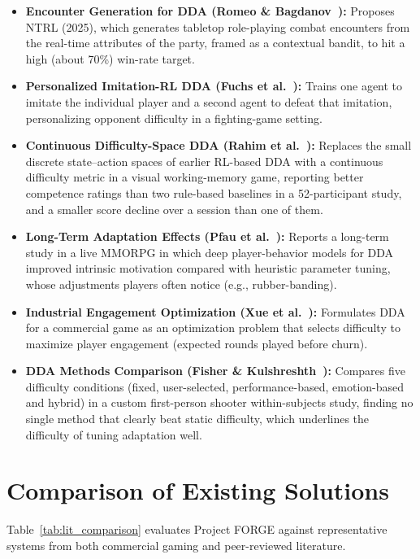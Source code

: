 \begin{itemize}
    \item \textbf{Encounter Generation for DDA (Romeo \& Bagdanov~\cite{romeo2025ntrl}):} Proposes NTRL (2025), which generates tabletop role-playing combat encounters from the real-time attributes of the party, framed as a contextual bandit, to hit a high (about 70\%) win-rate target.
    \item \textbf{Personalized Imitation-RL DDA (Fuchs et al.~\cite{fuchs2024personalized}):} Trains one agent to imitate the individual player and a second agent to defeat that imitation, personalizing opponent difficulty in a fighting-game setting.
    \item \textbf{Continuous Difficulty-Space DDA (Rahim et al.~\cite{rahim2023continuous}):} Replaces the small discrete state--action spaces of earlier RL-based DDA with a continuous difficulty metric in a visual working-memory game, reporting better competence ratings than two rule-based baselines in a 52-participant study, and a smaller score decline over a session than one of them.
    \item \textbf{Long-Term Adaptation Effects (Pfau et al.~\cite{pfau2020enemy}):} Reports a long-term study in a live MMORPG in which deep player-behavior models for DDA improved intrinsic motivation compared with heuristic parameter tuning, whose adjustments players often notice (e.g., rubber-banding).
    \item \textbf{Industrial Engagement Optimization (Xue et al.~\cite{xue2017dynamic}):} Formulates DDA for a commercial game as an optimization problem that selects difficulty to maximize player engagement (expected rounds played before churn).
    \item \textbf{DDA Methods Comparison (Fisher \& Kulshreshth~\cite{fisher2024exploring}):} Compares five difficulty conditions (fixed, user-selected, performance-based, emotion-based and hybrid) in a custom first-person shooter within-subjects study, finding no single method that clearly beat static difficulty, which underlines the difficulty of tuning adaptation well.
\end{itemize}

\section{Comparison of Existing Solutions}
Table~\ref{tab:lit_comparison} evaluates Project FORGE against representative systems from both commercial gaming and peer-reviewed literature.


